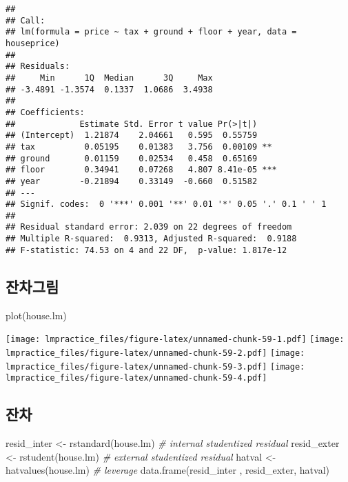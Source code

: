 \documentclass[
]{book}
\newenvironment{Shaded}{\begin{snugshade}}{\end{snugshade}}
\newcommand{\CommentTok}[1]{\textcolor[rgb]{0.56,0.35,0.01}{\textit{#1}}}
\newcommand{\FunctionTok}[1]{\textcolor[rgb]{0.00,0.00,0.00}{#1}}
\newcommand{\NormalTok}[1]{#1}
\newcommand{\OtherTok}[1]{\textcolor[rgb]{0.56,0.35,0.01}{#1}}
\begin{document}
\begin{verbatim}
## 
## Call:
## lm(formula = price ~ tax + ground + floor + year, data = houseprice)
## 
## Residuals:
##     Min      1Q  Median      3Q     Max 
## -3.4891 -1.3574  0.1337  1.0686  3.4938 
## 
## Coefficients:
##             Estimate Std. Error t value Pr(>|t|)    
## (Intercept)  1.21874    2.04661   0.595  0.55759    
## tax          0.05195    0.01383   3.756  0.00109 ** 
## ground       0.01159    0.02534   0.458  0.65169    
## floor        0.34941    0.07268   4.807 8.41e-05 ***
## year        -0.21894    0.33149  -0.660  0.51582    
## ---
## Signif. codes:  0 '***' 0.001 '**' 0.01 '*' 0.05 '.' 0.1 ' ' 1
## 
## Residual standard error: 2.039 on 22 degrees of freedom
## Multiple R-squared:  0.9313, Adjusted R-squared:  0.9188 
## F-statistic: 74.53 on 4 and 22 DF,  p-value: 1.817e-12
\end{verbatim}

\hypertarget{uxc794uxcc28uxadf8uxb9bc-1}{%
\subsection{잔차그림}\label{uxc794uxcc28uxadf8uxb9bc-1}}

\begin{Shaded}
\begin{Highlighting}[]
\FunctionTok{plot}\NormalTok{(house.lm)}
\end{Highlighting}
\end{Shaded}

\texttt{[image: lmpractice\_files/figure-latex/unnamed-chunk-59-1.pdf]} \texttt{[image: lmpractice\_files/figure-latex/unnamed-chunk-59-2.pdf]} \texttt{[image: lmpractice\_files/figure-latex/unnamed-chunk-59-3.pdf]} \texttt{[image: lmpractice\_files/figure-latex/unnamed-chunk-59-4.pdf]}

\hypertarget{uxc794uxcc28-1}{%
\subsection{잔차}\label{uxc794uxcc28-1}}

\begin{Shaded}
\begin{Highlighting}[]
\NormalTok{resid\_inter }\OtherTok{\textless{}{-}} \FunctionTok{rstandard}\NormalTok{(house.lm)  }\CommentTok{\# internal studentized residual}
\NormalTok{resid\_exter }\OtherTok{\textless{}{-}} \FunctionTok{rstudent}\NormalTok{(house.lm)   }\CommentTok{\# external studentized residual}
\NormalTok{hatval }\OtherTok{\textless{}{-}} \FunctionTok{hatvalues}\NormalTok{(house.lm)       }\CommentTok{\# leverage}
\FunctionTok{data.frame}\NormalTok{(resid\_inter , resid\_exter, hatval)}
\end{Highlighting}
\end{Shaded}
\end{document}
